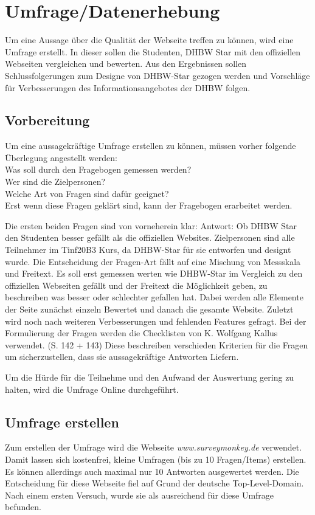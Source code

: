 \chapter{Umfrage/Datenerhebung}
Um eine Aussage über die Qualität der Webseite treffen zu können, wird eine Umfrage erstellt. In dieser sollen die Studenten, DHBW Star mit den offiziellen Webseiten vergleichen und bewerten.
Aus den Ergebnissen sollen Schlussfolgerungen zum Designe von DHBW-Star gezogen werden und Vorschläge für Verbesserungen des Informationsangebotes der DHBW folgen.

\section{Vorbereitung}
Um eine aussagekräftige Umfrage erstellen zu können, müssen vorher folgende Überlegung angestellt werden: \\
Was soll durch den Fragebogen gemessen werden? \\
Wer sind die Zielpersonen? \\
Welche Art von Fragen sind dafür geeignet? \\
Erst wenn diese Fragen geklärt sind, kann der Fragebogen erarbeitet werden.

Die ersten beiden Fragen sind von vorneherein klar:
Antwort: Ob DHBW Star den Studenten besser gefällt als die offiziellen Websites.
Zielpersonen sind alle Teilnehmer im Tinf20B3 Kurs, da DHBW-Star für sie entworfen und designt wurde.
Die Entscheidung der Fragen-Art fällt auf eine Mischung von Messskala und Freitext. Es soll erst gemessen werten wie DHBW-Star im Vergleich zu den offiziellen Webseiten gefällt und der Freitext die Möglichkeit geben, zu beschreiben was besser oder schlechter gefallen hat.
Dabei werden alle Elemente der Seite zunächst einzeln Bewertet und danach die gesamte Website.
Zuletzt wird noch nach weiteren Verbesserungen und fehlenden Features gefragt.
Bei der Formulierung der Fragen werden die Checklisten von K. Wolfgang Kallus verwendet.
\cite{fragebogenKallus}(S. 142 + 143)
Diese beschreiben verschieden Kriterien für die Fragen um sicherzustellen, dass sie aussagekräftige Antworten Liefern.

Um die Hürde für die Teilnehme und den Aufwand der Auswertung gering zu halten, wird die Umfrage Online durchgeführt.

\section{Umfrage erstellen}
Zum erstellen der Umfrage wird die Webseite \emph{www.surveymonkey.de} verwendet. Damit lassen sich kostenfrei, kleine Umfragen (bis zu 10 Fragen/Items) erstellen. Es können allerdings auch maximal nur 10 Antworten ausgewertet werden.
Die Entscheidung für diese Webseite fiel auf Grund der deutsche Top-Level-Domain. Nach einem ersten Versuch, wurde sie als ausreichend für diese Umfrage befunden.

